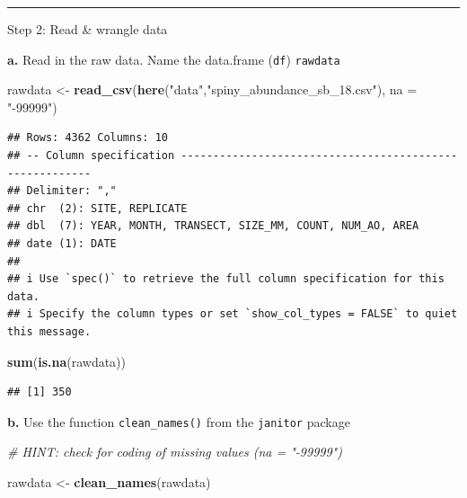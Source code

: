 \documentclass[
]{article}
\newenvironment{Shaded}{\begin{snugshade}}{\end{snugshade}}
\newcommand{\AttributeTok}[1]{\textcolor[rgb]{0.13,0.29,0.53}{#1}}
\newcommand{\CommentTok}[1]{\textcolor[rgb]{0.56,0.35,0.01}{\textit{#1}}}
\newcommand{\FunctionTok}[1]{\textcolor[rgb]{0.13,0.29,0.53}{\textbf{#1}}}
\newcommand{\NormalTok}[1]{#1}
\newcommand{\OtherTok}[1]{\textcolor[rgb]{0.56,0.35,0.01}{#1}}
\newcommand{\StringTok}[1]{\textcolor[rgb]{0.31,0.60,0.02}{#1}}
\begin{document}
\begin{center}\rule{0.5\linewidth}{0.5pt}\end{center}

Step 2: Read \& wrangle data

\textbf{a.} Read in the raw data. Name the data.frame (\texttt{df})
\texttt{rawdata}

\begin{Shaded}
\begin{Highlighting}[]
\NormalTok{rawdata }\OtherTok{\textless{}{-}} \FunctionTok{read\_csv}\NormalTok{(}\FunctionTok{here}\NormalTok{(}\StringTok{"data"}\NormalTok{,}\StringTok{"spiny\_abundance\_sb\_18.csv"}\NormalTok{),}
                         \AttributeTok{na =} \StringTok{"{-}99999"}\NormalTok{)}
\end{Highlighting}
\end{Shaded}

\begin{verbatim}
## Rows: 4362 Columns: 10
## -- Column specification --------------------------------------------------------
## Delimiter: ","
## chr  (2): SITE, REPLICATE
## dbl  (7): YEAR, MONTH, TRANSECT, SIZE_MM, COUNT, NUM_AO, AREA
## date (1): DATE
## 
## i Use `spec()` to retrieve the full column specification for this data.
## i Specify the column types or set `show_col_types = FALSE` to quiet this message.
\end{verbatim}

\begin{Shaded}
\begin{Highlighting}[]
\FunctionTok{sum}\NormalTok{(}\FunctionTok{is.na}\NormalTok{(rawdata))}
\end{Highlighting}
\end{Shaded}

\begin{verbatim}
## [1] 350
\end{verbatim}

\textbf{b.} Use the function \texttt{clean\_names()} from the
\texttt{janitor} package

\begin{Shaded}
\begin{Highlighting}[]
\CommentTok{\# HINT: check for coding of missing values (\textasciigrave{}na = "{-}99999"\textasciigrave{})}

\NormalTok{rawdata }\OtherTok{\textless{}{-}} \FunctionTok{clean\_names}\NormalTok{(rawdata)}
\end{Highlighting}
\end{Shaded}
\end{document}

